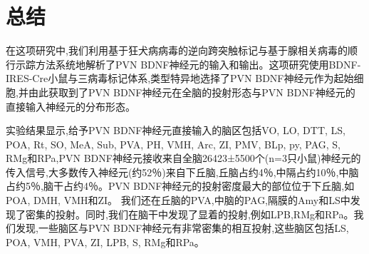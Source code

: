 \chapter{总结}
在这项研究中,我们利用基于狂犬病病毒的逆向跨突触标记与基于腺相关病毒的顺行示踪方法系统地解析了PVN BDNF神经元的输入和输出。这项研究使用BDNF-IRES-Cre小鼠与三病毒标记体系,类型特异地选择了PVN BDNF神经元作为起始细胞,并由此获取到了PVN BDNF神经元在全脑的投射形态与PVN BDNF神经元的直接输入神经元的分布形态。

实验结果显示,给予PVN BDNF神经元直接输入的脑区包括VO, LO, DTT, LS, POA, Rt, SO, MeA, Sub, PVA, PH, VMH, Arc, ZI, PMV, BLp, py, PAG, S, RMg和RPa,PVN BDNF神经元接收来自全脑26423±5500个(n=3只小鼠)神经元的传入信号,大多数传入神经元(约52％)来自下丘脑,丘脑占约4％,中隔占约10％,中脑占约5％,脑干占约4％。PVN BDNF神经元的投射密度最大的部位位于下丘脑,如POA, DMH, VMH和ZI。 我们还在丘脑的PVA,中脑的PAG,隔膜的Amy和LS中发现了密集的投射。同时,我们在脑干中发现了显着的投射,例如LPB,RMg和RPa。我们发现,一些脑区与PVN BDNF神经元有非常密集的相互投射,这些脑区包括LS, POA, VMH, PVA, ZI, LPB, S, RMg和RPa。

